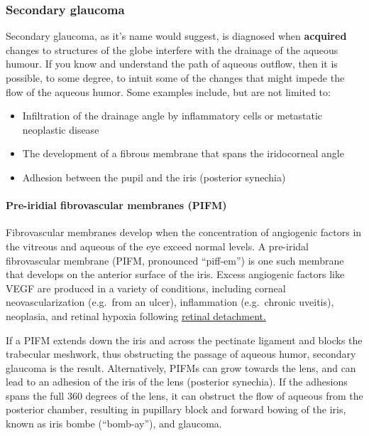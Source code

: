 \documentclass[openany]{article}
\providecommand{\tightlist}{%
  \setlength{\itemsep}{0pt}\setlength{\parskip}{0pt}}
\let\oldparagraph\paragraph
\renewcommand{\paragraph}[1]{\oldparagraph{#1}\mbox{}}
\begin{document}
\subsubsection{Secondary glaucoma}\label{secondary-glaucoma}

Secondary glaucoma, as it's name would suggest, is diagnosed when
\textbf{acquired} changes to structures of the globe interfere with the
drainage of the aqueous humour. If you know and understand the path of
aqueous outflow, then it is possible, to some degree, to intuit some of
the changes that might impede the flow of the aqueous humor. Some
examples include, but are not limited to:

\begin{itemize}
\tightlist
\item
  Infiltration of the drainage angle by inflammatory cells or metastatic
  neoplastic disease
\item
  The development of a fibrous membrane that spans the iridocorneal
  angle
\item
  Adhesion between the pupil and the iris (posterior synechia)
\end{itemize}

\hypertarget{pre-iridial-fibrovascular-membranes-pifm}{\paragraph{Pre-iridial
fibrovascular membranes
(PIFM)}\label{pre-iridial-fibrovascular-membranes-pifm}}

Fibrovascular membranes develop when the concentration of angiogenic
factors in the vitreous and aqueous of the eye exceed normal levels. A
pre-iridal fibrovascular membrane (PIFM, pronounced ``piff-em'') is one
such membrane that develops on the anterior surface of the iris. Excess
angiogenic factors like VEGF are produced in a variety of conditions,
including corneal neovascularization (e.g.~from an ulcer), inflammation
(e.g.~chronic uveitis), neoplasia, and retinal hypoxia following
\protect\hyperlink{retinal-detachment}{retinal detachment.}

If a PIFM extends down the iris and across the pectinate ligament and
blocks the trabecular meshwork, thus obstructing the passage of aqueous
humor, secondary glaucoma is the result. Alternatively, PIFMs can grow
towards the lens, and can lead to an adhesion of the iris of the lens
(posterior synechia). If the adhesions spans the full 360 degrees of the
lens, it can obstruct the flow of aqueous from the posterior chamber,
resulting in pupillary block and forward bowing of the iris, known as
iris bombe (``bomb-ay''), and glaucoma.
\end{document}
